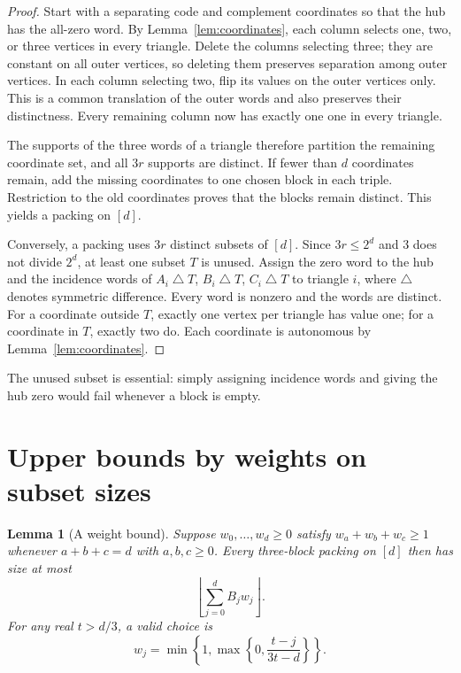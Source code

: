 \documentclass[11pt]{article}
\newtheorem{lemma}[theorem]{Lemma}
\theoremstyle{definition}
\numberwithin{equation}{section}
\begin{document}
\begin{proof}
Start with a separating code and complement coordinates so that the
hub has the all-zero word. By Lemma~\ref{lem:coordinates}, each column
selects one, two, or three vertices in every triangle. Delete the columns
selecting three; they are constant on all outer vertices, so deleting
them preserves separation among outer vertices. In each column selecting
two, flip its values on the outer vertices only. This is a common
translation of the outer words and also preserves their distinctness.
Every remaining column now has exactly one one in every triangle.

The supports of the three words of a triangle therefore partition the
remaining coordinate set, and all $3r$ supports are distinct. If fewer
than $d$ coordinates remain, add the missing coordinates to one chosen
block in each triple. Restriction to the old coordinates proves that
the blocks remain distinct. This yields a packing on $[d]$.

Conversely, a packing uses $3r$ distinct subsets of $[d]$. Since
$3r\leq2^d$ and $3$ does not divide $2^d$, at least one subset $T$ is
unused. Assign the zero word to the hub and the incidence words of
$A_i\mathbin{\triangle}T$, $B_i\mathbin{\triangle}T$,
$C_i\mathbin{\triangle}T$ to triangle $i$, where $\triangle$ denotes
symmetric difference. Every word is nonzero and the words are distinct.
For a coordinate outside $T$, exactly one vertex per triangle has value
one; for a coordinate in $T$, exactly two do. Each coordinate is
autonomous by Lemma~\ref{lem:coordinates}.
\end{proof}

The unused subset is essential: simply assigning incidence words and
giving the hub zero would fail whenever a block is empty.

\section{Upper bounds by weights on subset sizes}

\begin{lemma}[A weight bound]\label{lem:weight}
Suppose $w_0,\ldots,w_d\geq0$ satisfy
$w_a+w_b+w_c\geq1$ whenever $a+b+c=d$ with $a,b,c\geq0$.
Every three-block packing on $[d]$ then has size at most
\[
 \left\lfloor\sum_{j=0}^d B_jw_j\right\rfloor.
\]
For any real $t>d/3$, a valid choice is
\[
 w_j=\min\left\{1,\max\left\{0,\frac{t-j}{3t-d}\right\}\right\}.
\]
\end{lemma}
\end{document}
